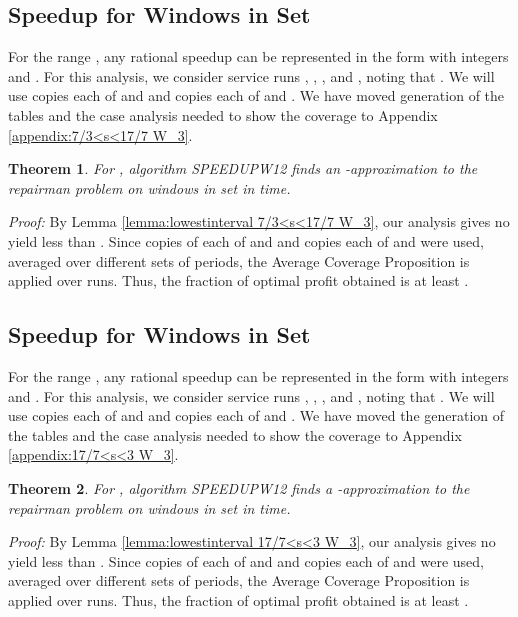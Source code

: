 \documentclass[11pt]{article}
\newtheorem{theorem}{Theorem}[section]
\newcommand\QED{\ifhmode\allowbreak\else\nobreak\fi
\quad\nobreak\medbreak}
\newcommand{\proofstart}{\par\noindent \emph{Proof:} }
\newcommand{\proofend}{\QED\par}
\newenvironment{proof}{\proofstart}{\proofend}
\begin{document}
\subsection{Speedup  for Windows in Set }

For the range , any rational speedup  can be represented in the form  with integers  and .  For this analysis, we consider service runs , , , and , noting that .  We will use  copies each of  and  and  copies each of  and .  We have moved generation of the tables and the case analysis needed to show the coverage to Appendix \ref{appendix:7/3<s<17/7 W_3}.

\begin{theorem}
For , algorithm SPEEDUPW12 finds an -approximation to the repairman problem on windows in set  in  time.
\end{theorem}

\begin{proof}
By Lemma \ref{lemma:lowestinterval 7/3<s<17/7 W_3}, our analysis gives no yield less than .  Since  copies of each of  and  and  copies each of  and  were used, averaged over  different sets of periods, the Average Coverage Proposition is applied over  runs.  Thus, the fraction of optimal profit obtained is at least .
\end{proof}

\subsection{Speedup  for Windows in Set }

For the range , any rational speedup  can be represented in the form  with integers  and .  For this analysis, we consider service runs , , , and , noting that . We will use  copies each of  and  and  copies each of  and .  We have moved the generation of the tables and the case analysis needed to show the coverage to Appendix \ref{appendix:17/7<s<3 W_3}.

\begin{theorem}
For , algorithm SPEEDUPW12 finds a -approximation to the repairman problem on windows in set  in  time.
\end{theorem}

\begin{proof}
By Lemma \ref{lemma:lowestinterval 17/7<s<3 W_3}, our analysis gives no yield less than .  Since  copies of each of  and  and  copies each of  and  were used, averaged over  different sets of periods, the Average Coverage Proposition is applied over  runs.  Thus, the fraction of optimal profit obtained is at least .
\end{proof}
\end{document}
